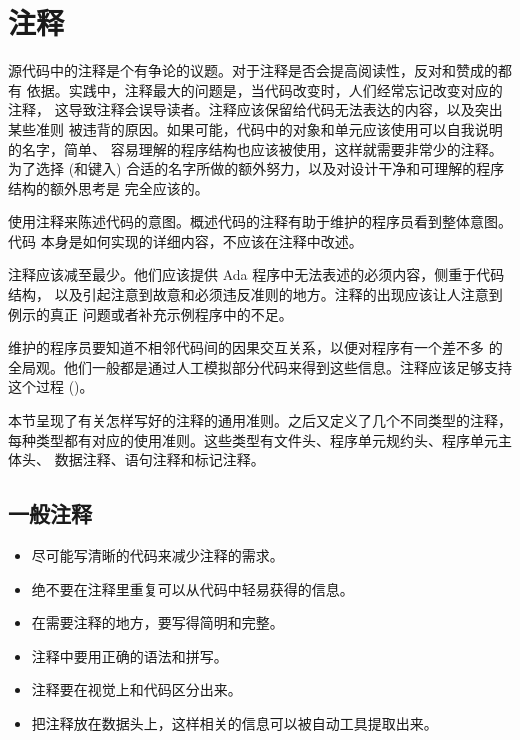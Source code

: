 \section{注释}
源代码中的注释是个有争论的议题。对于注释是否会提高阅读性，反对和赞成的都有
依据。实践中，注释最大的问题是，当代码改变时，人们经常忘记改变对应的注释，
这导致注释会误导读者。注释应该保留给代码无法表达的内容，以及突出某些准则
被违背的原因。如果可能，代码中的对象和单元应该使用可以自我说明的名字，简单、
容易理解的程序结构也应该被使用，这样就需要非常少的注释。为了选择 (和键入)
合适的名字所做的额外努力，以及对设计干净和可理解的程序结构的额外思考是
完全应该的。

使用注释来陈述代码的意图。概述代码的注释有助于维护的程序员看到整体意图。代码
本身是如何实现的详细内容，不应该在注释中改述。

注释应该减至最少。他们应该提供 Ada 程序中无法表述的必须内容，侧重于代码结构，
以及引起注意到故意和必须违反准则的地方。注释的出现应该让人注意到例示的真正
问题或者补充示例程序中的不足。

维护的程序员要知道不相邻代码间的因果交互关系，以便对程序有一个差不多
的全局观。他们一般都是通过人工模拟部分代码来得到这些信息。注释应该足够支持
这个过程 (\cite{soloway86})。

本节呈现了有关怎样写好的注释的通用准则。之后又定义了几个不同类型的注释，
每种类型都有对应的使用准则。这些类型有文件头、程序单元规约头、程序单元主体头、
数据注释、语句注释和标记注释。

\subsection{一般注释}
\begin{itemize}
    \item 尽可能写清晰的代码来减少注释的需求。
    \item 绝不要在注释里重复可以从代码中轻易获得的信息。
    \item 在需要注释的地方，要写得简明和完整。
    \item 注释中要用正确的语法和拼写。
    \item 注释要在视觉上和代码区分出来。
    \item 把注释放在数据头上，这样相关的信息可以被自动工具提取出来。
\end{itemize}

